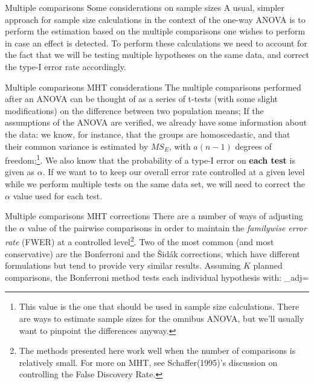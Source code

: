 \documentclass[t]{beamer}
\begin{document}

\begin{ftst}
{Multiple comparisons}
{Some considerations on sample sizes}
A usual, simpler approach for sample size calculations in the context of the one-way ANOVA is to perform the estimation based on the multiple comparisons one wishes to perform in case an effect is detected.
\vhalf
To perform these calculations we need to account for the fact that we will be testing multiple hypotheses on the same data, and correct the type-I error rate accordingly.
\end{ftst}


\begin{ftst}
{Multiple comparisons}
{MHT considerations}
The multiple comparisons performed after an ANOVA can be thought of as a series of t-tests (with some slight modifications) on the difference between two population means;
\vone
If the assumptions of the ANOVA are verified, we already have some information about the data: we know, for instance, that the groups are homoscedastic, and that their common variance is estimated by $MS_E$, with $a(n-1)$ degrees of freedom;\footnote{\tiny This value is the one that should be used in sample size calculations. There are ways to estimate sample sizes for the omnibus ANOVA, but we'll usually want to pinpoint the differences anyway.}.
\vone
We also know that the probability of a type-I error on \textbf{each test} is given as $\alpha$. If we want to to keep our overall error rate controlled at a given level while we perform multiple tests on the same data set, we will need to correct the $\alpha$ value used for each test.
\end{ftst} 


\begin{ftst}
{Multiple comparisons}
{MHT corrections}
There are a number of ways of adjusting the $\alpha$ value of the pairwise comparisons in order to maintain the \textit{familywise error rate} (FWER) at a controlled level\footnote[3]{\tiny The methods presented here work well when the number of comparisons is relatively small. For more on MHT, see Schaffer(1995)'s discussion on controlling the False Discovery Rate.}.
\vhalf
Two of the most common (and most conservative) are the Bonferroni and the \v{S}id\'ak corrections, which have different formulations but tend to provide very similar results.
\vhalf
Assuming $K$ planned comparisons, the Bonferroni method tests each individual hypothesis with:
\beqs
\alpha_{adj}=
\eqs
\end{ftst}
\end{document}
